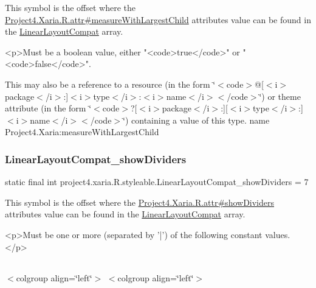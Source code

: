 This symbol is the offset where the \hyperlink{}{Project4.\+Xaria.\+R.\+attr\#measure\+With\+Largest\+Child} attribute\textquotesingle{}s value can be found in the \hyperlink{classproject4_1_1xaria_1_1R_1_1styleable_a7f929bdf7d740d51fa83ce463e56c432}{Linear\+Layout\+Compat} array.

\begin{DoxyVerb}      <p>Must be a boolean value, either "<code>true</code>" or "<code>false</code>".
\end{DoxyVerb}
 

This may also be a reference to a resource (in the form \char`\"{}$<$code$>$@\mbox{[}$<$i$>$package$<$/i$>$\+:\mbox{]}$<$i$>$type$<$/i$>$\+:$<$i$>$name$<$/i$>$$<$/code$>$\char`\"{}) or theme attribute (in the form \char`\"{}$<$code$>$?\mbox{[}$<$i$>$package$<$/i$>$\+:\mbox{]}\mbox{[}$<$i$>$type$<$/i$>$\+:\mbox{]}$<$i$>$name$<$/i$>$$<$/code$>$\char`\"{}) containing a value of this type.  name Project4.\+Xaria\+:measure\+With\+Largest\+Child \mbox{\label{classproject4_1_1xaria_1_1R_1_1styleable_aa54ceb6abf29ba55186f4ef137e636d8}} 
\subsubsection{\texorpdfstring{Linear\+Layout\+Compat\+\_\+show\+Dividers}{LinearLayoutCompat\_showDividers}}
{\footnotesize\ttfamily static final int project4.\+xaria.\+R.\+styleable.\+Linear\+Layout\+Compat\+\_\+show\+Dividers = 7\hspace{0.3cm}{\ttfamily [static]}}

This symbol is the offset where the \hyperlink{}{Project4.\+Xaria.\+R.\+attr\#show\+Dividers} attribute\textquotesingle{}s value can be found in the \hyperlink{classproject4_1_1xaria_1_1R_1_1styleable_a7f929bdf7d740d51fa83ce463e56c432}{Linear\+Layout\+Compat} array.

\begin{DoxyVerb}      <p>Must be one or more (separated by '|') of the following constant values.</p>
\end{DoxyVerb}
 \tabulinesep=1mm
\begin{longtabu} spread 0pt [c]{*{0}{|X[-1]}|}
\hline
\end{longtabu}
$<$colgroup align=\char`\"{}left\char`\"{}$>$ $<$colgroup align=\char`\"{}left\char`\"{}$>$ 

